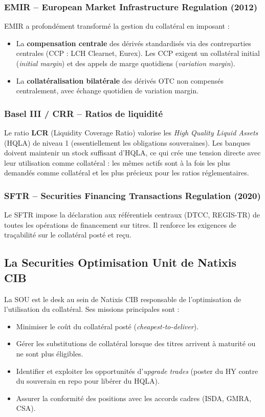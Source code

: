 \documentclass[12pt,a4paper]{article}
\begin{document}
\subsubsection{EMIR -- European Market Infrastructure Regulation (2012)}

EMIR a profondément transformé la gestion du collatéral en imposant :
\begin{itemize}
  \item La \textbf{compensation centrale} des dérivés standardisés via des contreparties
    centrales (CCP : LCH Clearnet, Eurex). Les CCP exigent un collatéral initial
    (\textit{initial margin}) et des appels de marge quotidiens (\textit{variation margin}).
  \item La \textbf{collatéralisation bilatérale} des dérivés OTC non compensés
    centralement, avec échange quotidien de variation margin.
\end{itemize}

\subsubsection{Basel III / CRR -- Ratios de liquidité}

Le ratio \textbf{LCR} (Liquidity Coverage Ratio) valorise les \textit{High Quality Liquid
Assets} (HQLA) de niveau 1 (essentiellement les obligations souveraines). Les banques
doivent maintenir un stock suffisant d'HQLA, ce qui crée une tension directe avec
leur utilisation comme collatéral : les mêmes actifs sont à la fois les plus demandés
comme collatéral et les plus précieux pour les ratios réglementaires.

\subsubsection{SFTR -- Securities Financing Transactions Regulation (2020)}

Le SFTR impose la déclaration aux référentiels centraux (DTCC, REGIS-TR) de toutes les
opérations de financement sur titres. Il renforce les exigences de traçabilité sur le
collatéral posté et reçu.

\subsection{La Securities Optimisation Unit de Natixis CIB}

La SOU est le desk au sein de Natixis CIB responsable de l'optimisation de l'utilisation
du collatéral. Ses missions principales sont :
\begin{itemize}
  \item Minimiser le coût du collatéral posté (\textit{cheapest-to-deliver}).
  \item Gérer les substitutions de collatéral lorsque des titres arrivent à maturité ou
    ne sont plus éligibles.
  \item Identifier et exploiter les opportunités d'\textit{upgrade trades} (poster du HY
    contre du souverain en repo pour libérer du HQLA).
  \item Assurer la conformité des positions avec les accords cadres (ISDA, GMRA, CSA).
\end{itemize}
\end{document}
